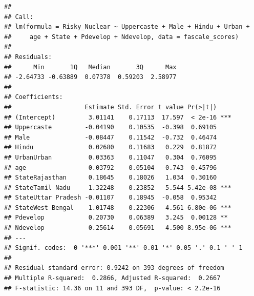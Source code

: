 \documentclass[
]{article}
\begin{document}
\begin{verbatim}
## 
## Call:
## lm(formula = Risky_Nuclear ~ Uppercaste + Male + Hindu + Urban + 
##     age + State + Pdevelop + Ndevelop, data = fascale_scores)
## 
## Residuals:
##      Min       1Q   Median       3Q      Max 
## -2.64733 -0.63889  0.07378  0.59203  2.58977 
## 
## Coefficients:
##                    Estimate Std. Error t value Pr(>|t|)    
## (Intercept)         3.01141    0.17113  17.597  < 2e-16 ***
## Uppercaste         -0.04190    0.10535  -0.398  0.69105    
## Male               -0.08447    0.11542  -0.732  0.46474    
## Hindu               0.02680    0.11683   0.229  0.81872    
## UrbanUrban          0.03363    0.11047   0.304  0.76095    
## age                 0.03792    0.05104   0.743  0.45796    
## StateRajasthan      0.18645    0.18026   1.034  0.30160    
## StateTamil Nadu     1.32248    0.23852   5.544 5.42e-08 ***
## StateUttar Pradesh -0.01107    0.18945  -0.058  0.95342    
## StateWest Bengal    1.01748    0.22306   4.561 6.80e-06 ***
## Pdevelop            0.20730    0.06389   3.245  0.00128 ** 
## Ndevelop            0.25614    0.05691   4.500 8.95e-06 ***
## ---
## Signif. codes:  0 '***' 0.001 '**' 0.01 '*' 0.05 '.' 0.1 ' ' 1
## 
## Residual standard error: 0.9242 on 393 degrees of freedom
## Multiple R-squared:  0.2866, Adjusted R-squared:  0.2667 
## F-statistic: 14.36 on 11 and 393 DF,  p-value: < 2.2e-16
\end{verbatim}
\end{document}
